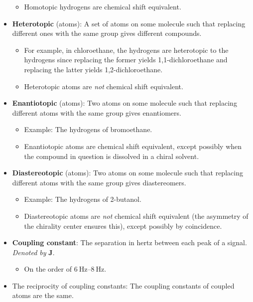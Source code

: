 \documentclass[../notes.tex]{subfiles}
\begin{document}
\begin{itemize}
\begin{itemize}
        \item Homotopic hydrogens are chemical shift equivalent.
    \end{itemize}
    \item \textbf{Heterotopic} (atoms): A set of atoms on some molecule such that replacing different ones with the same group gives different compounds.
    \begin{itemize}
        \item For example, in chloroethane, the  hydrogens are heterotopic to the  hydrogens since replacing the former yields 1,1-dichloroethane and replacing the latter yields 1,2-dichloroethane.
        \item Heterotopic atoms are \emph{not} chemical shift equivalent.
    \end{itemize}
    \item \textbf{Enantiotopic} (atoms): Two atoms on some molecule such that replacing different atoms with the same group gives enantiomers.
    \begin{itemize}
        \item Example: The  hydrogens of bromoethane.
        \item Enantiotopic atoms are chemical shift equivalent, except possibly when the compound in question is dissolved in a chiral solvent.
    \end{itemize}
    \item \textbf{Diastereotopic} (atoms): Two atoms on some molecule such that replacing different atoms with the same group gives diastereomers.
    \begin{itemize}
        \item Example: The  hydrogens of 2-butanol.
        \item Diastereotopic atoms are \emph{not} chemical shift equivalent (the asymmetry of the chirality center ensures this), except possibly by coincidence.
    \end{itemize}
    \item \textbf{Coupling constant}: The separation in hertz between each peak of a signal. \emph{Denoted by} $\bm{J}$.
    \begin{itemize}
        \item On the order of $\SIrange{6}{8}{\hertz}$.
    \end{itemize}
    \item The reciprocity of coupling constants: The coupling constants of coupled atoms are the same.
    \begin{itemize}

\end{itemize}
\end{itemize}
\end{document}
